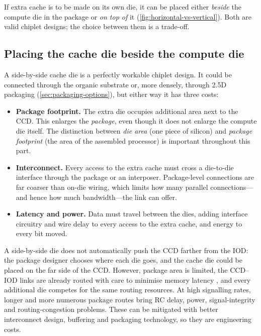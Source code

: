 If extra cache is to be made on its own die, it can be placed either \emph{beside} the compute die in the package or \emph{on top of} it (\cref{fig:horizontal-vs-vertical}). Both are valid chiplet designs; the choice between them is a trade-off.



\subsection{Placing the cache die beside the compute die}
A side-by-side cache die is a perfectly workable chiplet design. It could be connected through the organic substrate or, more densely, through 2.5D packaging (\cref{sec:packaging-options}), but either way it has three costs:
\begin{itemize}
  \item \textbf{Package footprint.} The extra die occupies additional area next to the CCD. This enlarges the \emph{package}, even though it does not enlarge the compute die itself. The distinction between \emph{die area} (one piece of silicon) and \emph{package footprint} (the area of the assembled processor) is important throughout this part.
  \item \textbf{Interconnect.} Every access to the extra cache must cross a die-to-die interface through the package or an interposer. Package-level connections are far coarser than on-die wiring, which limits how many parallel connections---and hence how much bandwidth---the link can offer.
  \item \textbf{Latency and power.} Data must travel between the dies, adding interface circuitry and wire delay to every access to the extra cache, and energy to every bit moved.
\end{itemize}

A side-by-side die does not automatically push the CCD farther from the IOD: the package designer chooses where each die goes, and the cache die could be placed on the far side of the CCD. However, package area is limited, the CCD--IOD links are already routed with care to minimise memory latency \cite{naffziger2020chiplet}, and every additional die competes for the same routing resources. At high signalling rates, longer and more numerous package routes bring RC delay, power, signal-integrity and routing-congestion problems. These can be mitigated with better interconnect design, buffering and packaging technology, so they are engineering costs.

